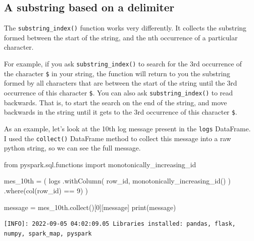 \documentclass[
  11pt,
  letterpaper,
  DIV=11,
  numbers=noendperiod]{scrreprt}
\newenvironment{Shaded}{\begin{snugshade}}{\end{snugshade}}
\newcommand{\BuiltInTok}[1]{\textcolor[rgb]{0.00,0.23,0.31}{#1}}
\newcommand{\DecValTok}[1]{\textcolor[rgb]{0.68,0.00,0.00}{#1}}
\newcommand{\ImportTok}[1]{\textcolor[rgb]{0.00,0.46,0.62}{#1}}
\newcommand{\NormalTok}[1]{\textcolor[rgb]{0.00,0.23,0.31}{#1}}
\newcommand{\OperatorTok}[1]{\textcolor[rgb]{0.37,0.37,0.37}{#1}}
\newcommand{\StringTok}[1]{\textcolor[rgb]{0.13,0.47,0.30}{#1}}
\begin{document}
\hypertarget{a-substring-based-on-a-delimiter}{%
\subsection{A substring based on a
delimiter}\label{a-substring-based-on-a-delimiter}}

The \texttt{substring\_index()} function works very differently. It
collects the substring formed between the start of the string, and the
nth occurrence of a particular character.

For example, if you ask \texttt{substring\_index()} to search for the
3rd occurrence of the character \texttt{\$} in your string, the function
will return to you the substring formed by all characters that are
between the start of the string until the 3rd occurrence of this
character \texttt{\$}. You can also ask \texttt{substring\_index()} to
read backwards. That is, to start the search on the end of the string,
and move backwards in the string until it gets to the 3rd occurrence of
this character \texttt{\$}.

As an example, let's look at the 10th log message present in the
\texttt{logs} DataFrame. I used the \texttt{collect()} DataFrame method
to collect this message into a raw python string, so we can see the full
message.

\begin{Shaded}
\begin{Highlighting}[]
\ImportTok{from}\NormalTok{ pyspark.sql.functions }\ImportTok{import}\NormalTok{ monotonically\_increasing\_id}

\NormalTok{mes\_10th }\OperatorTok{=}\NormalTok{ (}
\NormalTok{    logs}
\NormalTok{    .withColumn(}
        \StringTok{\textquotesingle{}row\_id\textquotesingle{}}\NormalTok{,}
\NormalTok{        monotonically\_increasing\_id()}
\NormalTok{    )}
\NormalTok{    .where(col(}\StringTok{\textquotesingle{}row\_id\textquotesingle{}}\NormalTok{) }\OperatorTok{==} \DecValTok{9}\NormalTok{)}
\NormalTok{)}

\NormalTok{message }\OperatorTok{=}\NormalTok{ mes\_10th.collect()[}\DecValTok{0}\NormalTok{][}\StringTok{\textquotesingle{}message\textquotesingle{}}\NormalTok{]}
\BuiltInTok{print}\NormalTok{(message)}
\end{Highlighting}
\end{Shaded}

\begin{verbatim}
[INFO]: 2022-09-05 04:02:09.05 Libraries installed: pandas, flask, numpy, spark_map, pyspark
\end{verbatim}
\end{document}
